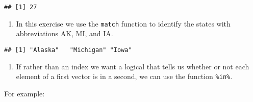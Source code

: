 \documentclass[]{article}
\newenvironment{Shaded}{\begin{snugshade}}{\end{snugshade}}
\newcommand{\CommentTok}[1]{\textcolor[rgb]{0.56,0.35,0.01}{\textit{#1}}}
\newcommand{\DecValTok}[1]{\textcolor[rgb]{0.00,0.00,0.81}{#1}}
\newcommand{\KeywordTok}[1]{\textcolor[rgb]{0.13,0.29,0.53}{\textbf{#1}}}
\newcommand{\NormalTok}[1]{#1}
\newcommand{\OperatorTok}[1]{\textcolor[rgb]{0.81,0.36,0.00}{\textbf{#1}}}
\newcommand{\StringTok}[1]{\textcolor[rgb]{0.31,0.60,0.02}{#1}}
\providecommand{\tightlist}{%
  \setlength{\itemsep}{0pt}\setlength{\parskip}{0pt}}
\begin{document}
\begin{verbatim}
## [1] 27
\end{verbatim}

\begin{enumerate}
\def\labelenumi{\arabic{enumi}.}
\setcounter{enumi}{5}
\tightlist
\item
  In this exercise we use the \texttt{match} function to identify the
  states with abbreviations AK, MI, and IA.
\end{enumerate}

\begin{Shaded}
\end{Shaded}

\begin{verbatim}
## [1] "Alaska"   "Michigan" "Iowa"
\end{verbatim}

\begin{enumerate}
\def\labelenumi{\arabic{enumi}.}
\setcounter{enumi}{6}
\tightlist
\item
  If rather than an index we want a logical that tells us whether or not
  each element of a first vector is in a second, we can use the function
  \texttt{\%in\%}.
\end{enumerate}

For example:

\begin{Shaded}
\end{Shaded}
\end{document}
